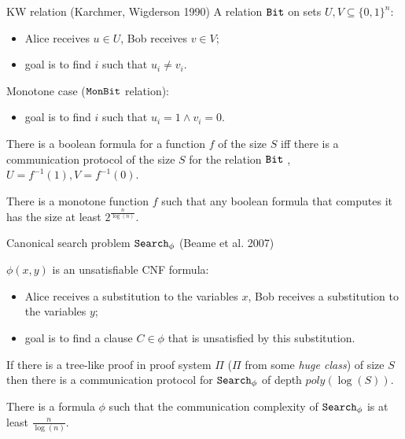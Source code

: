 \begin{frame}{KW relation (Karchmer, Wigderson 1990)}
    A relation $\mathtt{Bit}$ on sets $U, V \subseteq \{0, 1\}^{n}$:
    \begin{itemize}
        \item Alice receives $u \in U$, Bob receives $v \in V$;
        \item goal is to find $i$ such that $u_i \neq v_i$.
    \end{itemize}
    \pause
    Monotone case ($\mathtt{MonBit}$ relation):
    \begin{itemize}
        \item goal is to find $i$ such that $u_i = 1 \land v_i = 0$.
    \end{itemize}

    \pause

    \begin{theorem}
        There is a  boolean formula for a function $f$ of the size $S$ iff there is a
        communication protocol of the size $S$ for the relation $\mathtt{Bit}$ , $U = f^{-1}(1), V =
        f^{-1}(0)$.
    \end{theorem}

    \pause
    \pause
    
    \begin{theorem}[Pitassi, G{\"{o}}{\"{o}}s, 2014]
        There is a monotone function $f$ such that any boolean formula that computes it has the size at least
        $2^{\frac{n}{\log(n)}}$. 
    \end{theorem}
\end{frame}

\begin{frame}{Canonical search problem $\mathtt{Search}_{\phi}$ (Beame et al. 2007)}
    
    $\phi(x, y)$ is an unsatisfiable CNF formula:
    \begin{itemize}
        \item Alice receives a substitution to the variables $x$, Bob receives a substitution to the variables $y$;
        \item goal is to find a clause $C \in \phi$ that is unsatisfied by this substitution.
    \end{itemize}

    \pause

    \begin{theorem}
        If there is a tree-like proof in proof system $\Pi$ ($\Pi$ from some \textit{huge class}) of size $S$ then there is a
        communication protocol for $\mathtt{Search}_{\phi}$ of depth $poly(\log(S))$.
    \end{theorem}

    \pause
    
    \begin{theorem}[Pitassi, G{\"{o}}{\"{o}}s, 2014]
        There is a formula $\phi$ such that the communication complexity of $\mathtt{Search}_{\phi}$ is at least $\frac{n}{\log(n)}$.
    \end{theorem}
\end{frame}

